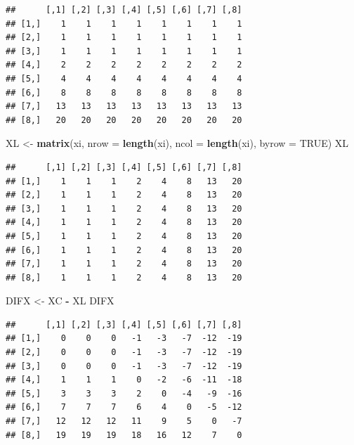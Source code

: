 \documentclass[
]{book}
\newenvironment{Shaded}{\begin{snugshade}}{\end{snugshade}}
\newcommand{\DataTypeTok}[1]{\textcolor[rgb]{0.13,0.29,0.53}{#1}}
\newcommand{\KeywordTok}[1]{\textcolor[rgb]{0.13,0.29,0.53}{\textbf{#1}}}
\newcommand{\NormalTok}[1]{#1}
\newcommand{\OperatorTok}[1]{\textcolor[rgb]{0.81,0.36,0.00}{\textbf{#1}}}
\newcommand{\OtherTok}[1]{\textcolor[rgb]{0.56,0.35,0.01}{#1}}
\newcommand{\StringTok}[1]{\textcolor[rgb]{0.31,0.60,0.02}{#1}}
\begin{document}
\begin{verbatim}
##      [,1] [,2] [,3] [,4] [,5] [,6] [,7] [,8]
## [1,]    1    1    1    1    1    1    1    1
## [2,]    1    1    1    1    1    1    1    1
## [3,]    1    1    1    1    1    1    1    1
## [4,]    2    2    2    2    2    2    2    2
## [5,]    4    4    4    4    4    4    4    4
## [6,]    8    8    8    8    8    8    8    8
## [7,]   13   13   13   13   13   13   13   13
## [8,]   20   20   20   20   20   20   20   20
\end{verbatim}

\begin{Shaded}
\begin{Highlighting}[]
\NormalTok{XL <-}\StringTok{ }\KeywordTok{matrix}\NormalTok{(xi, }\DataTypeTok{nrow =} \KeywordTok{length}\NormalTok{(xi), }\DataTypeTok{ncol =} \KeywordTok{length}\NormalTok{(xi), }
    \DataTypeTok{byrow =} \OtherTok{TRUE}\NormalTok{)}
\NormalTok{XL}
\end{Highlighting}
\end{Shaded}

\begin{verbatim}
##      [,1] [,2] [,3] [,4] [,5] [,6] [,7] [,8]
## [1,]    1    1    1    2    4    8   13   20
## [2,]    1    1    1    2    4    8   13   20
## [3,]    1    1    1    2    4    8   13   20
## [4,]    1    1    1    2    4    8   13   20
## [5,]    1    1    1    2    4    8   13   20
## [6,]    1    1    1    2    4    8   13   20
## [7,]    1    1    1    2    4    8   13   20
## [8,]    1    1    1    2    4    8   13   20
\end{verbatim}

\begin{Shaded}
\begin{Highlighting}[]
\NormalTok{DIFX <-}\StringTok{ }\NormalTok{XC }\OperatorTok{-}\StringTok{ }\NormalTok{XL}
\NormalTok{DIFX}
\end{Highlighting}
\end{Shaded}

\begin{verbatim}
##      [,1] [,2] [,3] [,4] [,5] [,6] [,7] [,8]
## [1,]    0    0    0   -1   -3   -7  -12  -19
## [2,]    0    0    0   -1   -3   -7  -12  -19
## [3,]    0    0    0   -1   -3   -7  -12  -19
## [4,]    1    1    1    0   -2   -6  -11  -18
## [5,]    3    3    3    2    0   -4   -9  -16
## [6,]    7    7    7    6    4    0   -5  -12
## [7,]   12   12   12   11    9    5    0   -7
## [8,]   19   19   19   18   16   12    7    0
\end{verbatim}
\end{document}
